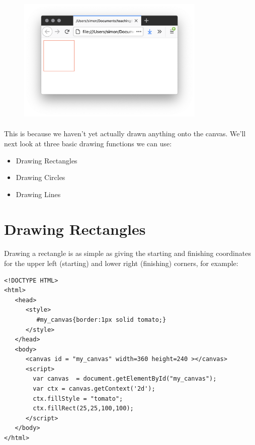 \begin{figure}[H]
\centering
\includegraphics[width=0.8\textwidth]{figures/canvas}
\label{fig:canvas}
\caption{}
\end{figure}


\paragraph{} This is because we haven't yet actually drawn anything onto the canvas. We'll next look at three basic drawing functions we can use:

\begin{itemize}
\item Drawing Rectangles
\item Drawing Circles
\item Drawing Lines
\end{itemize}



\section{Drawing Rectangles}
\paragraph{} Drawing a rectangle is as simple as giving the starting and finishing coordinates for the upper left (starting) and lower right (finishing) corners, for example:

\begin{lstlisting}
<!DOCTYPE HTML>
<html>
   <head>
      <style>
         #my_canvas{border:1px solid tomato;}
      </style>
   </head>
   <body>
      <canvas id = "my_canvas" width=360 height=240 ></canvas>
      <script>
        var canvas  = document.getElementById("my_canvas");
        var ctx = canvas.getContext('2d');
        ctx.fillStyle = "tomato";
        ctx.fillRect(25,25,100,100);
      </script>
   </body>
</html>
\end{lstlisting}


